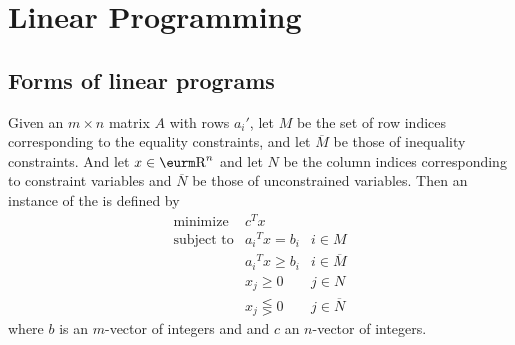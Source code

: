 \documentclass{myproc}
\begin{document}
\section{Linear Programming}
\subsection{Forms of linear programs}
\bit
\w Given an $m \times n$ matrix $A$ with rows $a_i'$, let $M$ be the set of
row indices corresponding to the equality constraints, and let $\overline{M}$ be
those of inequality constraints. 
And let $x \in \R^n$ and let $N$ be the column indices corresponding to
constraint variables and $\overline{N}$ be those of unconstrained variables.
Then an instance of the  is defined by
	\begin{eqnarray*}
	\mbox{minimize} & c^Tx & \\
	\mbox{subject to} & {a_i}^Tx = b_i & i \in M \\
	 & {a_i}^Tx \ge b_i & i \in \overline{M} \\
	& x_j \ge 0 & j \in {N} \\
	 & x_j \lesseqgtr 0 & j \in \overline{N}
	\end{eqnarray*}
where $b$ is an $m$-vector of integers and and $c$ an $n$-vector of integers.
\end{document}
